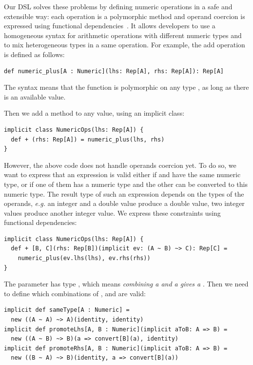 \documentclass[american,english,runningheads]{llncs}
\newcommand{\eg}{\emph{e.g.}}
\begin{document}
Our DSL solves these problems by defining numeric operations in a safe and extensible way: each operation is a polymorphic method and operand coercion is expressed using functional dependencies~\cite{Jones00_FunDeps}. It allows developers to use a homogeneous syntax for arithmetic operations with different numeric types and to mix heterogeneous types in a same operation. For example, the add operation is defined as follows:

\begin{lstlisting}
def numeric_plus[A : Numeric](lhs: Rep[A], rhs: Rep[A]): Rep[A]
\end{lstlisting}

The  syntax means that the function is polymorphic on any type , as long as there is an available  value.

Then we add a \code{+} method to any  value, using an implicit class:

\begin{lstlisting}
implicit class NumericOps(lhs: Rep[A]) {
  def + (rhs: Rep[A]) = numeric_plus(lhs, rhs)
}
\end{lstlisting}

However, the above code does not handle operands coercion yet. To do so, we want to express that an expression  is valid either if  and  have the same numeric type, or if one of them has a numeric type and the other can be converted to this numeric type. The result type of such an expression depends on the types of the operands, \eg{} an integer and a double value produce a double value, two integer values produce another integer value. We express these constraints using functional dependencies:

\begin{lstlisting}
implicit class NumericOps(lhs: Rep[A]) {
  def + [B, C](rhs: Rep[B])(implicit ev: (A ~ B) ~> C): Rep[C] =
    numeric_plus(ev.lhs(lhs), ev.rhs(rhs))
}
\end{lstlisting}

The  parameter has type , which means \emph{combining a  and a  gives a }. Then we need to define which combinations of ,  and  are valid:

\begin{lstlisting}
implicit def sameType[A : Numeric] =
  new ((A ~ A) ~> A)(identity, identity)
implicit def promoteLhs[A, B : Numeric](implicit aToB: A => B) =
  new ((A ~ B) ~> B)(a => convert[B](a), identity)
implicit def promoteRhs[A, B : Numeric](implicit aToB: A => B) =
  new ((B ~ A) ~> B)(identity, a => convert[B](a))
\end{lstlisting}
\end{document}
